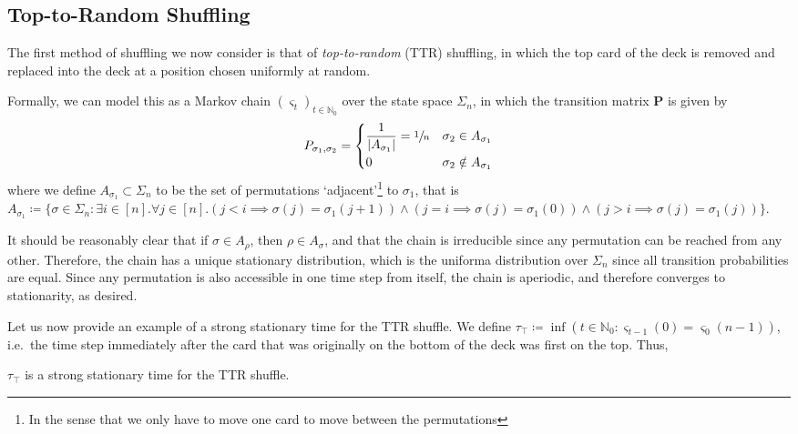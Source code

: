 	\subsection{Top-to-Random Shuffling}
		The first method of shuffling we now consider is that of \emph{top-to-random} (TTR) 
		shuffling, in which the top card of the deck is removed and replaced into the deck
		at a position chosen uniformly at random.\par
		Formally, we can model this as a Markov chain $(\varsigma_t)_{t\in\mathbb{N}_0}$ 
		over the state space $\Sigma_n$, in 
		which the transition matrix $\mathbf{P}$ is given by
		$$
			P_{\sigma_1, \sigma_2} = 
			\begin{dcases}
				\frac{1}{|A_{\sigma_1}|} = \sfrac{1}{n} 
				& \sigma_2 \in A_{\sigma_1} \\
				0 & \sigma_2 \notin A_{\sigma_1}
			\end{dcases}
		$$
		where we define $A_{\sigma_1} \subset \Sigma_n$ to be the set of permutations 
		`adjacent'\footnote{In the sense that we only have to move one card to move between 
		the permutations} 
		to $\sigma_1$, that is $A_{\sigma_1} \coloneqq \{\sigma\in\Sigma_n
		: \exists i \in [n]. \forall j \in [n] . (j < i \implies \sigma(j)=\sigma_1(j+1))
		\land (j = i \implies \sigma(j) = \sigma_1(0)) \land (j > i \implies \sigma(j)=
		\sigma_1(j))\}$.\par
		It should be reasonably clear that if $\sigma \in A_\rho$, then $\rho \in
		A_\sigma$, and that the chain is irreducible since any permutation can be reached 
		from any other. Therefore, the chain has a unique stationary distribution, which is
		the uniforma distribution over $\Sigma_n$ since all transition probabilities are 
		equal. Since any permutation is also accessible in one time step from 
		itself, the chain is aperiodic, and therefore converges to stationarity, as 
		desired. \par
		Let us now provide an example of a strong stationary time for the TTR shuffle. 
		We define $\tau_\top \coloneqq \inf(t\in\mathbb{N}_0:\varsigma_{t-1}(0)
		= \varsigma_{0}(n-1))$, i.e.\ the time step immediately after the card that was 
		originally on the bottom of the deck was first on the top. Thus,
		\begin{claim}
			$\tau_\top$ is a strong stationary time for the TTR shuffle.
		\end{claim}
